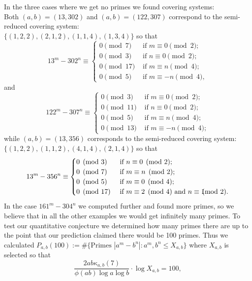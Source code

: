 \documentclass[12pt, a4paper,  reqno, english]{amsart}%
\numberwithin{equation}{section}
\theoremstyle{definition}
\renewcommand{\mod}[1]{\hspace{-2.9mm}\pmod{#1}}
\renewcommand{\leq}{\leqslant}
\begin{document}
In the three cases where we get no primes we found covering systems:\\
Both $(a,b)=(13, 302)$ and $(a,b)=(122,307)$ correspond to the semi-reduced covering system: \\
$\{(1,2,2),(2,1,2),(1,1,4),(1,3,4)\}$ so that
 \[
 13^m-302^n\equiv
 \begin{cases}
   0 \pmod 7 &\text{  if } m\equiv 0 \pmod 2;\\
 0 \pmod {3} &\text{  if } n\equiv 0\pmod 2;\\
 0 \pmod {17} &\text{  if } m\equiv n\pmod 4;\\
  0 \pmod {5} &\text{  if } m\equiv -n\pmod 4,
 \end{cases}
 \]
 and
 \[
 122^m-307^n\equiv
 \begin{cases}
   0 \pmod 3 &\text{  if } m\equiv 0 \pmod 2;\\
 0 \pmod {11} &\text{  if } n\equiv 0\pmod 2;\\
 0 \pmod {5} &\text{  if } m\equiv n\pmod 4;\\
  0 \pmod {13} &\text{  if } m\equiv -n\pmod 4;
 \end{cases}
 \]
  while  $(a,b)=(13,356)$ corresponds
to the semi-reduced covering system: \\
$\{(1,2,2),(1,1,2),(4,1,4),(2,1,4)\}$  so that
 \[
 13^m-356^n\equiv
 \begin{cases}
   0 \pmod 3 &\text{  if } n\equiv 0 \pmod 2;\\
 0 \pmod {7} &\text{  if } m\equiv n\pmod 2;\\
 0 \pmod {5} &\text{  if } m\equiv 0\pmod 4;\\
  0 \pmod {17} &\text{  if } m\equiv 2 \pmod 4 \text{ and } n \equiv 1\mod 2.
 \end{cases}
 \]
 In the case $161^m-304^n$ we computed further and found more primes, so we believe that in all the other examples we would get infinitely many primes. To test our quantitative conjecture we determined how many primes there are up to the point that our prediction claimed there would be 100 primes. Thus we calculated
 $P_{a,b}(100):=\#\{ \text{Primes }  |a^m-b^n|: a^m,b^n\leq X_{a,b}\}$ where $X_{a,b}$ is selected so that
 \[
  \frac{2ab\kappa_{a,b}(7)}{\phi(ab)\log a\log b}\cdot \log X_{a,b}=100,
 \]
\end{document}
